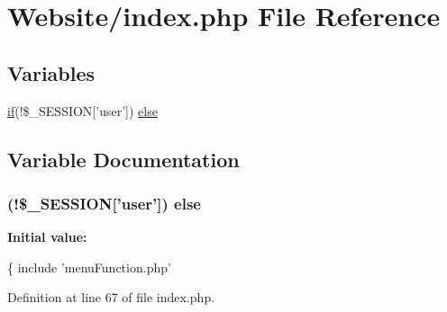 \hypertarget{index_8php}{\section{Website/index.php File Reference}
\label{index_8php}
}
\subsection*{Variables}
\begin{DoxyCompactItemize}
\item 
\hyperlink{_m_c_mhome_page_8php_a8dec719c1645067d1065f7f064d4b967}{if}(!\$\-\_\-\-S\-E\-S\-S\-I\-O\-N\mbox{[}'user'\mbox{]}) \hyperlink{index_8php_a5366423e36e55e3a9f66374094ae7449}{else}
\end{DoxyCompactItemize}


\subsection{Variable Documentation}
\hypertarget{index_8php_a5366423e36e55e3a9f66374094ae7449}{
\subsubsection[{else}]{ (!\$\-\_\-\-S\-E\-S\-S\-I\-O\-N\mbox{[}'user'\mbox{]}) else}}\label{index_8php_a5366423e36e55e3a9f66374094ae7449}
{\bfseries Initial value\-:}
\begin{DoxyCode}
\{
                include \textcolor{stringliteral}{'menuFunction.php'}
\end{DoxyCode}


Definition at line 67 of file index.\-php.


